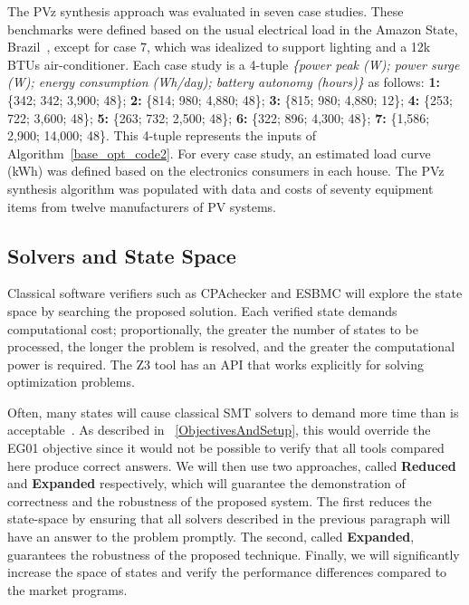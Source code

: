 \documentclass[review]{elsarticle}
\begin{document}
The PVz synthesis approach was evaluated in seven case studies. These benchmarks were defined based on the usual electrical load in the Amazon State, Brazil~\citep{TrindadeCordeiro19,Agrener2013}, except for case 7, which was idealized to support lighting and a 12k BTUs air-conditioner. 
Each case study is a 4-tuple \textit{\{power peak (W); power surge (W); energy consumption (Wh/day); battery autonomy (hours)\} } as follows:
  \textbf{1:} \{342; 342; 3,900; 48\}; \textbf{2:} \{814; 980; 4,880; 48\}; \textbf{3:} \{815; 980; 4,880; 12\}; \textbf{4:} \{253; 722; 3,600; 48\}; \textbf{5:} \{263; 732; 2,500; 48\}; \textbf{6:} \{322; 896; 4,300; 48\}; \textbf{7:} \{1,586; 2,900; 14,000; 48\}. This 4-tuple represents the inputs of Algorithm~\ref{base_opt_code2}. For every case study, an estimated load curve (kWh) was defined based on the electronics consumers in each house. The PVz synthesis algorithm was populated with data and costs of seventy equipment items from twelve manufacturers of PV systems. 

\subsection{Solvers and State Space}
\label{sec:SolversandStateSpace}
Classical software verifiers such as CPAchecker and ESBMC will explore the state space by searching the proposed solution. Each verified state demands computational cost; proportionally, the greater the number of states to be processed, the longer the problem is resolved, and the greater the computational power is required. The Z3 tool has an API that works explicitly for solving optimization problems.

Often, many states will cause classical SMT solvers to demand more time than is acceptable~\citep{abs-1909-13139}. As described in ~\ref{ObjectivesAndSetup}, this would override the EG01 objective since it would not be possible to verify that all tools compared here produce correct answers. We will then use two approaches, called \textbf{Reduced} and \textbf{Expanded} respectively, which will guarantee the demonstration of correctness and the robustness of the proposed system. The first reduces the state-space by ensuring that all solvers described in the previous paragraph will have an answer to the problem promptly. The second, called \textbf{Expanded}, guarantees the robustness of the proposed technique. Finally, we will significantly increase the space of states and verify the performance differences compared to the market programs. 
\end{document}
